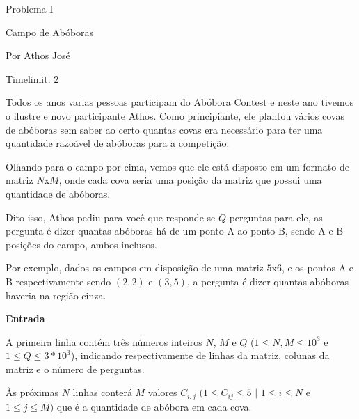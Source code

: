 \begin{center}
Problema I

Campo de Abóboras

{\tiny Por Athos José}

Timelimit: $2$	
\end{center}

Todos os anos varias pessoas participam do Abóbora Contest e neste ano tivemos o ilustre e novo participante Athos. Como principiante, ele plantou vários covas de abóboras sem saber ao certo quantas covas era necessário para ter uma quantidade razoável de abóboras para a competição.

Olhando para o campo por cima, vemos que ele está disposto em um formato de matriz $ N$x$M $, onde cada cova seria uma posição da matriz que possui uma quantidade de abóboras.

Dito isso, Athos pediu para você que responde-se $ Q $ perguntas para ele, as pergunta é dizer quantas abóboras há de um ponto A ao ponto B, sendo A e B posições do campo, ambos inclusos.

Por exemplo, dados os campos em disposição de uma matriz $ 5$x$6 $, e os pontos A e B respectivamente sendo $(2,2)$ e $(3,5)$, a pergunta é dizer quantas abóboras haveria na região cinza.

\begin{figure}[h]
    \centering
\end{figure}

\vspace{0.3cm}
\textbf{Entrada}

A primeira linha contém três números inteiros $ N $, $ M $ e $ Q $ ($ 1 \leq N, M \leq 10^3 $ e $ 1 \leq Q \leq 3*10^3 $), indicando respectivamente de linhas da matriz, colunas da matriz e o número de perguntas.

Às próximas $ N $ linhas conterá $ M $ valores $ C_{i,j} $ $ (1 \leq C_{ij} \leq 5$ $|$ $1 \leq i \leq N $ e $ 1 \leq j \leq M)$ que é a quantidade de abóbora em cada cova.

